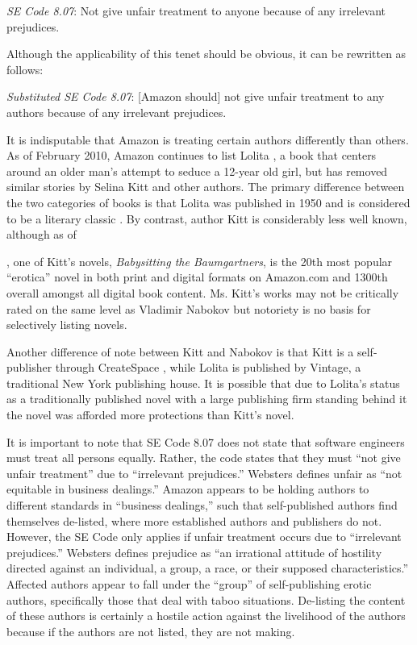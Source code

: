 \documentclass[11pt]{article}
\begin{document}
\begin{multicols}{2}
\emph{SE Code 8.07}: Not give unfair treatment to anyone because of any irrelevant prejudices.

Although the applicability of this tenet should be obvious, it can be rewritten as follows:

\emph{Substituted SE Code 8.07}: [Amazon should] not give unfair treatment to any authors because of any irrelevant prejudices.

It is indisputable that Amazon is treating certain authors differently than others.  As of February 2010, Amazon continues to list Lolita \cite{AmazonLolitaDTPListing}, a book that centers around an older man's attempt to seduce a 12-year old girl, but has removed similar stories by Selina Kitt and other authors. \cite{KittSelfPubRevolution}  The primary difference between the two categories of books is that Lolita was published in 1950 \cite{WikipediaLolita} and is considered to be a literary classic \cite{MLTop100}.  By contrast, author Kitt is considerably less well known, although as of \date{February 24, 2011}, one of Kitt's novels, \emph{Babysitting the Baumgartners}, is the 20th most popular ``erotica'' novel in both print and digital formats on Amazon.com and 1300th overall amongst all digital book content. \cite{AmazonBabysittingListing} Ms. Kitt's works may not be critically rated on the same level as Vladimir Nabokov but notoriety is no basis for selectively listing novels.

Another difference of note between Kitt and Nabokov is that Kitt is a self-publisher through CreateSpace \cite{KittSelfPubRevolution}, while Lolita is published by Vintage, a traditional New York publishing house.  \cite{WorldCatLolita} It is possible that due to Lolita's status as a traditionally published novel with a large publishing firm standing behind it the novel was afforded more protections than Kitt's novel.  

It is important to note that SE Code 8.07 does not state that software engineers must treat all persons equally.  Rather, the code states that they must ``not give unfair treatment'' due to ``irrelevant prejudices.'' Websters defines unfair as ``not equitable in business dealings.'' \cite{WebsterOnlineDict}  Amazon appears to be holding authors to different standards in ``business dealings,'' such that self-published authors find themselves de-listed, where more established authors and publishers do not.  However, the SE Code only applies if unfair treatment occurs due to ``irrelevant prejudices.''  Websters defines prejudice as ``an irrational attitude of hostility directed against an individual, a group, a race, or their supposed characteristics.'' \cite{WebsterOnlineDict} Affected authors appear to fall under the ``group'' of self-publishing erotic authors, specifically those that deal with taboo situations.  De-listing the content of these authors is certainly a hostile action against the livelihood of the authors because if the authors are not listed, they are not making.


\end{multicols}
\end{document}
